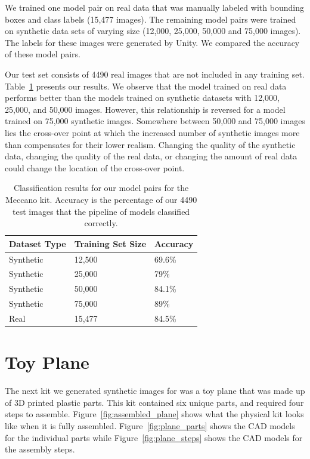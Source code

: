 We trained one model pair on real data that was manually labeled with
bounding boxes and class labels (15,477 images).
The remaining model pairs were trained on synthetic data sets of varying size
(12,000, 25,000, 50,000 and 75,000 images).
The labels for these images were generated by Unity.
We compared the accuracy of these model pairs.

Our test set consists of 4490 real images that are not included in any
training set.  Table~\ref{tab:meccano_accuracy} presents our results.  We
observe that the model trained on real data performs better than the
models trained on synthetic datasets with 12,000, 25,000, and 50,000
images.  However, this relationship is reversed for a model trained on
75,000 synthetic images.
Somewhere between 50,000 and 75,000 images
lies the cross-over point at which the increased number of synthetic
images more than compensates for their lower realism.
Changing the quality of the synthetic data, changing the quality of the real
data, or changing the amount of real data could change the location of the
cross-over point.

\begin{table}
\begin{tabular}{|l||l|l|}
\hline
  Dataset Type & Training Set Size & Accuracy\\
  \hline
  \hline
  Synthetic & 12,500 & 69.6\%\\
  Synthetic & 25,000 & 79\%\\
  Synthetic & 50,000 & 84.1\%\\
  Synthetic & 75,000 & 89\%\\
  \hline
  Real & 15,477 & 84.5\%\\
\hline
\end{tabular}
  \caption{
    Classification results for our model pairs for the Meccano kit.
    Accuracy is the percentage of our 4490 test images that the pipeline of
    models classified correctly.
  }\label{tab:meccano_accuracy}
\end{table}

\section{Toy Plane}

The next kit we generated synthetic images for was a toy plane that was made up
of 3D printed plastic parts.
This kit contained six unique parts, and required four steps to assemble.
Figure~\ref{fig:assembled_plane} shows what the physical kit looks like when it
is fully assembled.
Figure~\ref{fig:plane_parts} shows the CAD models for the individual parts while
Figure~\ref{fig:plane_steps} shows the CAD models for the assembly steps.

